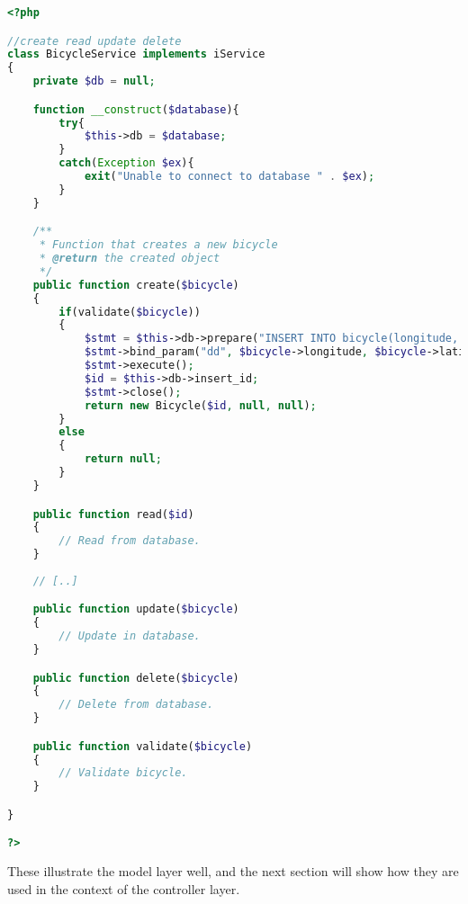 \begin{lstlisting}[language=php, label=lst:bicycleService, caption={BicycleService Class}]
<?php

//create read update delete
class BicycleService implements iService
{
    private $db = null;

    function __construct($database){
        try{
            $this->db = $database;
        }
        catch(Exception $ex){
            exit("Unable to connect to database " . $ex);
        }
    }

    /**
     * Function that creates a new bicycle
     * @return the created object
     */
    public function create($bicycle)
    {
        if(validate($bicycle))
        {
            $stmt = $this->db->prepare("INSERT INTO bicycle(longitude, latitude) VALUES (?,?)");
            $stmt->bind_param("dd", $bicycle->longitude, $bicycle->latitude);
            $stmt->execute();
            $id = $this->db->insert_id;
            $stmt->close();
            return new Bicycle($id, null, null);
        }
        else
        {
            return null;
        }
    }

    public function read($id)
    {
        // Read from database.
    }
    
    // [..]

    public function update($bicycle)
    {
        // Update in database.
    }

    public function delete($bicycle)
    {
        // Delete from database.
    }

    public function validate($bicycle)
    {
        // Validate bicycle.
    }

}

?>
\end{lstlisting}

These illustrate the model layer well, and the next section will show how they are used in the context of the controller layer.